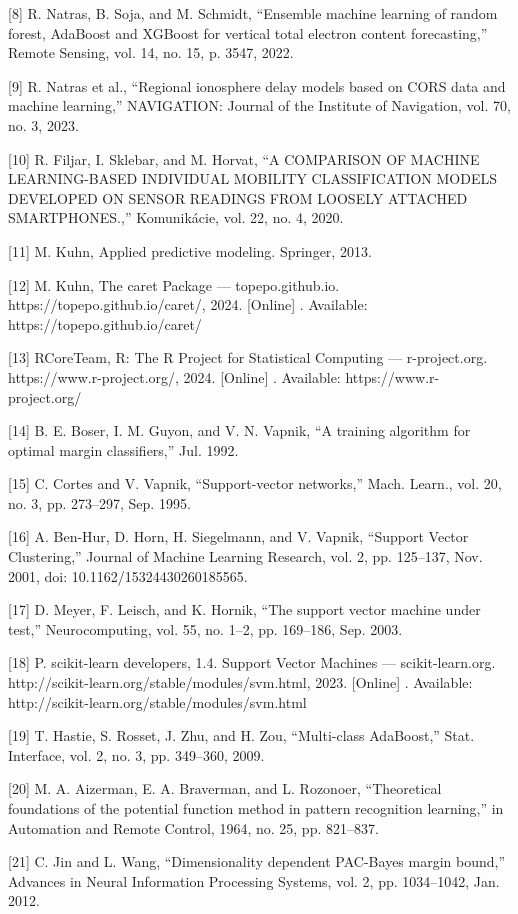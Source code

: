 \documentclass[sn-mathphys-num]{sn-jnl}%
\begin{document}
[8] R. Natras, B. Soja, and M. Schmidt, “Ensemble machine learning of random forest, AdaBoost and XGBoost for vertical total electron content forecasting,” Remote Sensing, vol. 14, no. 15, p. 3547, 2022.

[9] R. Natras et al., “Regional ionosphere delay models based on CORS data and machine learning,” NAVIGATION: Journal of the Institute of Navigation, vol. 70, no. 3, 2023.

[10] R. Filjar, I. Sklebar, and M. Horvat, “A COMPARISON OF MACHINE LEARNING-BASED INDIVIDUAL MOBILITY CLASSIFICATION MODELS DEVELOPED ON SENSOR READINGS FROM LOOSELY ATTACHED SMARTPHONES.,” Komunikácie, vol. 22, no. 4, 2020.

[11] M. Kuhn, Applied predictive modeling. Springer, 2013.

[12] M. Kuhn, The caret Package — topepo.github.io. https://topepo.github.io/caret/, 2024. [Online] . Available: https://topepo.github.io/caret/

[13] RCoreTeam, R: The R Project for Statistical Computing — r-project.org. https://www.r-project.org/, 2024. [Online] . Available: https://www.r-project.org/

[14] B. E. Boser, I. M. Guyon, and V. N. Vapnik, “A training algorithm for optimal margin classifiers,” Jul. 1992.

[15] C. Cortes and V. Vapnik, “Support-vector networks,” Mach. Learn., vol. 20, no. 3, pp. 273–297, Sep. 1995.

[16] A. Ben-Hur, D. Horn, H. Siegelmann, and V. Vapnik, “Support Vector Clustering,” Journal of Machine Learning Research, vol. 2, pp. 125–137, Nov. 2001, doi: 10.1162/15324430260185565.

[17] D. Meyer, F. Leisch, and K. Hornik, “The support vector machine under test,” Neurocomputing, vol. 55, no. 1–2, pp. 169–186, Sep. 2003.

[18] P. scikit-learn developers, 1.4. Support Vector Machines — scikit-learn.org. http://scikit-learn.org/stable/modules/svm.html, 2023. [Online] . Available: http://scikit-learn.org/stable/modules/svm.html

[19] T. Hastie, S. Rosset, J. Zhu, and H. Zou, “Multi-class AdaBoost,” Stat. Interface, vol. 2, no. 3, pp. 349–360, 2009.

[20] M. A. Aizerman, E. A. Braverman, and L. Rozonoer, “Theoretical foundations of the potential function method in pattern recognition learning,” in Automation and Remote Control, 1964, no. 25, pp. 821–837.

[21] C. Jin and L. Wang, “Dimensionality dependent PAC-Bayes margin bound,” Advances in Neural Information Processing Systems, vol. 2, pp. 1034–1042, Jan. 2012.
\end{document}
